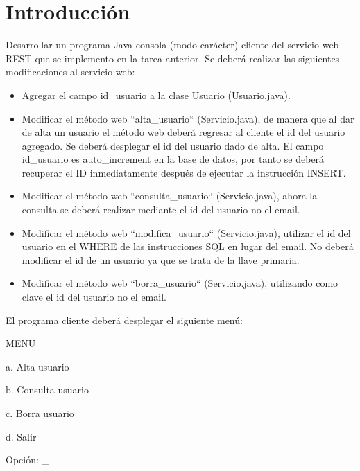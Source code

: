 \documentclass[11pt]{article}
\begin{document}
	\section{Introducción}
		Desarrollar un programa Java consola (modo carácter) cliente del servicio web REST que se implemento en la tarea anterior. Se deberá realizar las siguientes modificaciones al servicio web:
		\begin{itemize}
			\item Agregar el campo id\_usuario a la clase Usuario (Usuario.java).
			\item Modificar el método web ``alta\_usuario`` (Servicio.java), de manera que al dar de alta un usuario el método web deberá regresar al cliente el id del usuario agregado. Se deberá desplegar el id del usuario dado de alta. El campo id\_usuario es auto\_increment en la base de datos, por tanto se deberá recuperar el ID inmediatamente después de ejecutar la instrucción INSERT.
			\item Modificar el método web ``consulta\_usuario`` (Servicio.java), ahora la consulta se deberá realizar mediante el id del usuario no el email.
			\item Modificar el método web ``modifica\_usuario`` (Servicio.java), utilizar el id del usuario en el WHERE de las instrucciones SQL en lugar del email. No deberá modificar el id de un usuario ya que se trata de la llave primaria.
			\item Modificar el método web ``borra\_usuario`` (Servicio.java), utilizando como clave el id del usuario no el email.
		\end{itemize}
		El programa cliente deberá desplegar el siguiente menú:\par
		MENU\par
a. Alta usuario\par
b. Consulta usuario\par
c. Borra usuario\par
d. Salir\par
\par
Opción: \_\par
\end{document}
